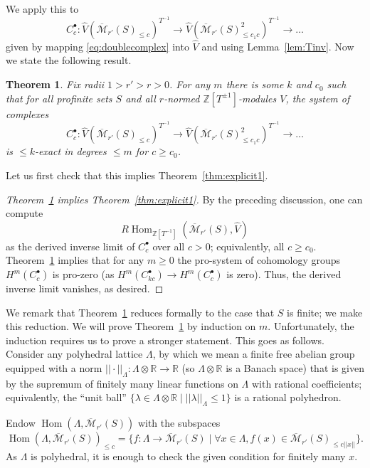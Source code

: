 \documentclass[11pt]{amsbook}
\DeclareMathOperator{\Hom}{Hom}
\renewcommand*{\hat}{\widehat}
\numberwithin{equation}{section}
\newtheorem{theorem}{Theorem}
\numberwithin{theorem}{section}
\theoremstyle{definition}
\begin{document}
We apply this to
\[
C_c^\bullet: \widehat{V}(\overline{\mathcal M}_{r'}(S)_{\leq c})^{T^{-1}}\to \widehat{V}(\overline{\mathcal M}_{r'}(S)_{\leq c_1c}^2)^{T^{-1}}\to \ldots
\]
given by mapping \eqref{eq:doublecomplex} into $\hat{V}$ and using Lemma~\ref{lem:Tinv}. Now we state the following result.

\begin{theorem}\label{thm:explicit2} Fix radii $1>r'>r>0$. For any $m$ there is some $k$ and $c_0$ such that for all profinite sets $S$ and all $r$-normed $\mathbb Z[T^{\pm 1}]$-modules $V$, the system of complexes
\[
C_c^\bullet: \widehat{V}(\overline{\mathcal M}_{r'}(S)_{\leq c})^{T^{-1}}\to \widehat{V}(\overline{\mathcal M}_{r'}(S)_{\leq c_1c}^2)^{T^{-1}}\to \ldots
\]
is $\leq k$-exact in degrees $\leq m$ for $c\geq c_0$.
\end{theorem}

Let us first check that this implies Theorem~\ref{thm:explicit1}.

\begin{proof}[Theorem~\ref{thm:explicit2} implies Theorem~\ref{thm:explicit1}] By the preceding discussion, one can compute
\[
R\Hom_{\mathbb Z[T^{-1}]}(\overline{\mathcal M}_{r'}(S),\widehat{V})
\]
as the derived inverse limit of $C_c^\bullet$ over all $c>0$; equivalently, all $c\geq c_0$. Theorem~\ref{thm:explicit2} implies that for any $m\geq 0$ the pro-system of cohomology groups $H^m(C_c^\bullet)$ is pro-zero (as $H^m(C_{kc}^\bullet)\to H^m(C_c^\bullet)$ is zero). Thus, the derived inverse limit vanishes, as desired.
\end{proof}

We remark that Theorem~\ref{thm:explicit2} reduces formally to the case that $S$ is finite; we make this reduction. We will prove Theorem~\ref{thm:explicit2} by induction on $m$. Unfortunately, the induction requires us to prove a stronger statement. This goes as follows. Consider any polyhedral lattice $\Lambda$, by which we mean a finite free abelian group equipped with a norm $||\cdot||_\Lambda: \Lambda\otimes \mathbb R\to \mathbb R$ (so $\Lambda\otimes \mathbb R$ is a Banach space) that is given by the supremum of finitely many linear functions on $\Lambda$ with rational coefficients; equivalently, the ``unit ball'' $\{\lambda\in \Lambda\otimes \mathbb R\mid ||\lambda||_\Lambda\leq 1\}$ is a rational polyhedron.

Endow $\Hom(\Lambda,\overline{\mathcal M}_{r'}(S))$ with the subspaces
\[
\Hom(\Lambda,\overline{\mathcal M}_{r'}(S))_{\leq c} = \{f: \Lambda\to \overline{\mathcal M}_{r'}(S)\mid \forall x\in \Lambda, f(x)\in \overline{\mathcal M}_{r'}(S)_{\leq c||x||}\}.
\]
As $\Lambda$ is polyhedral, it is enough to check the given condition for finitely many $x$.
\end{document}

